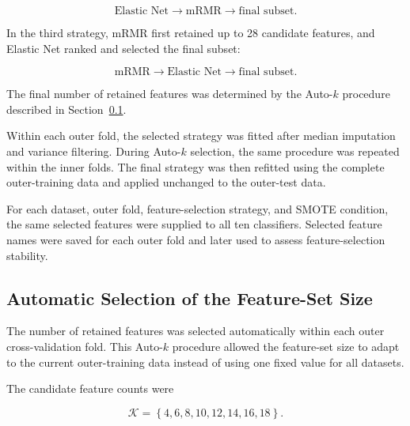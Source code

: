 \documentclass[12pt,twocolumn]{article}
\begin{document}
\begin{equation}
\text{Elastic Net}
\longrightarrow
\text{mRMR}
\longrightarrow
\text{final subset}.
\label{eq:elasticnet_mrmr_pipeline}
\end{equation}

In the third strategy, mRMR first retained up to 28 candidate features,
and Elastic Net ranked and selected the final subset:

\begin{equation}
\text{mRMR}
\longrightarrow
\text{Elastic Net}
\longrightarrow
\text{final subset}.
\label{eq:mrmr_elasticnet_pipeline}
\end{equation}

The final number of retained features was determined by the Auto-\(k\)
procedure described in Section~\ref{subsec:auto_k}.

Within each outer fold, the selected strategy was fitted after median
imputation and variance filtering. During Auto-\(k\) selection, the
same procedure was repeated within the inner folds. The final strategy
was then refitted using the complete outer-training data and applied
unchanged to the outer-test data.

For each dataset, outer fold, feature-selection strategy, and SMOTE
condition, the same selected features were supplied to all ten
classifiers. Selected feature names were saved for each outer fold and
later used to assess feature-selection stability.











\subsection{Automatic Selection of the Feature-Set Size}
\label{subsec:auto_k}

The number of retained features was selected automatically within each
outer cross-validation fold. This Auto-\(k\) procedure allowed the
feature-set size to adapt to the current outer-training data instead of
using one fixed value for all datasets.

The candidate feature counts were

\begin{equation}
\mathcal{K}=
\left\{
4,6,8,10,12,14,16,18
\right\}.
\label{eq:auto_k_candidates}
\end{equation}
\end{document}
